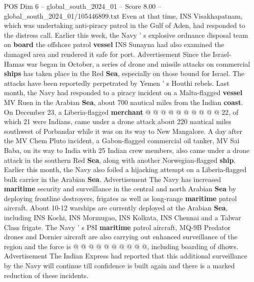 \begin{textsample}{POS Dim 6 – global\_south\_2024\_01 – Score 8.00 – global\_south\_2024\_01/105446899.txt}
Even at that time, INS Visakhapatnam, which was undertaking anti-piracy patrol in the Gulf of Aden, had responded to the distress call.
Earlier this week, the Navy ' s explosive ordnance disposal team on \textbf{board} the offshore patrol \textbf{vessel} INS Sunayna had also examined the damaged area and rendered it safe for port.
Advertisement Since the Israel-Hamas war began in October, a series of drone and missile attacks on commercial \textbf{ships} has taken place in the Red \textbf{Sea}, especially on those bound for Israel.
The attacks have been reportedly perpetrated by Yemen ' s Houthi rebels.
Last month, the Navy had responded to a piracy incident on a Malta-flagged \textbf{vessel} MV Ruen in the Arabian \textbf{Sea}, about 700 nautical miles from the Indian \textbf{coast}.
On December 23, a Liberia-flagged \textbf{merchant} @ @ @ @ @ @ @ @ @ @ 22, of which 21 were Indians, came under a drone attack about 220 nautical miles southwest of Porbandar while it was on its way to New Mangalore.
A day after the MV Chem Pluto incident, a Gabon-flagged commercial oil tanker, MV Sai Baba, on its way to India with 25 Indian crew members, also came under a drone attack in the southern Red \textbf{Sea}, along with another Norwegian-flagged \textbf{ship}.
Earlier this month, the Navy also foiled a hijacking attempt on a Liberia-flagged bulk carrier in the Arabian \textbf{Sea}.
Advertisement The Navy has increased \textbf{maritime} security and surveillance in the central and north Arabian \textbf{Sea} by deploying frontline destroyers, frigates as well as long-range \textbf{maritime} patrol aircraft.
About 10-12 warships are currently deployed at the Arabian \textbf{Sea}, including INS Kochi, INS Mormugao, INS Kolkata, INS Chennai and a Talwar Class frigate.
The Navy ' s P8I \textbf{maritime} patrol aircraft, MQ-9B Predator drones and Dornier aircraft are also carrying out enhanced surveillance of the region and the force is @ @ @ @ @ @ @ @ @ @, including boarding of dhows.
Advertisement The Indian Express had reported that this additional surveillance by the Navy will continue till confidence is built again and there is a marked reduction of these incidents.

\end{textsample}
